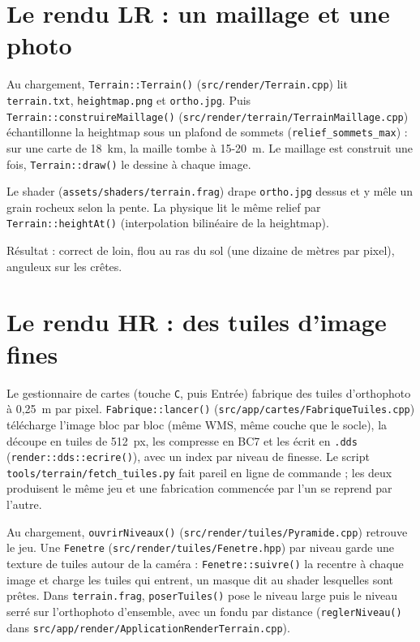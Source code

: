 \documentclass[a4paper,12pt]{article}
\newcommand{\code}[1]{\texttt{#1}}
\begin{document}
\section{Le rendu LR : un maillage et une photo}

Au chargement, \code{Terrain::Terrain()} (\code{src/render/Terrain.cpp}) lit
\code{terrain.txt}, \code{heightmap.png} et \code{ortho.jpg}. Puis
\code{Terrain::construireMaillage()}
(\code{src/render/terrain/TerrainMaillage.cpp}) échantillonne la heightmap
sous un plafond de sommets (\code{relief\_sommets\_max}) : sur une carte de
18~km, la maille tombe à 15-20~m. Le maillage est construit une fois,
\code{Terrain::draw()} le dessine à chaque image.

Le shader (\code{assets/shaders/terrain.frag}) drape \code{ortho.jpg} dessus
et y mêle un grain rocheux selon la pente. La physique lit le même relief par
\code{Terrain::heightAt()} (interpolation bilinéaire de la heightmap).

Résultat : correct de loin, flou au ras du sol (une dizaine de mètres par
pixel), anguleux sur les crêtes.

\newpage

\section{Le rendu HR : des tuiles d'image fines}

Le gestionnaire de cartes (touche \code{C}, puis Entrée) fabrique des tuiles
d'orthophoto à 0,25~m par pixel. \code{Fabrique::lancer()}
(\code{src/app/cartes/FabriqueTuiles.cpp}) télécharge l'image bloc par bloc
(même WMS, même couche que le socle), la découpe en tuiles de 512~px, les
compresse en BC7 et les écrit en \code{.dds} (\code{render::dds::ecrire()}),
avec un index par niveau de finesse. Le script
\code{tools/terrain/fetch\_tuiles.py} fait pareil en ligne de commande ; les
deux produisent le même jeu et une fabrication commencée par l'un se reprend
par l'autre.

Au chargement, \code{ouvrirNiveaux()} (\code{src/render/tuiles/Pyramide.cpp})
retrouve le jeu. Une \code{Fenetre} (\code{src/render/tuiles/Fenetre.hpp}) par
niveau garde une texture de tuiles autour de la caméra :
\code{Fenetre::suivre()} la recentre à chaque image et charge les tuiles qui
entrent, un masque dit au shader lesquelles sont prêtes. Dans
\code{terrain.frag}, \code{poserTuiles()} pose le niveau large puis le niveau
serré sur l'orthophoto d'ensemble, avec un fondu par distance
(\code{reglerNiveau()} dans
\code{src/app/render/ApplicationRenderTerrain.cpp}).
\end{document}
